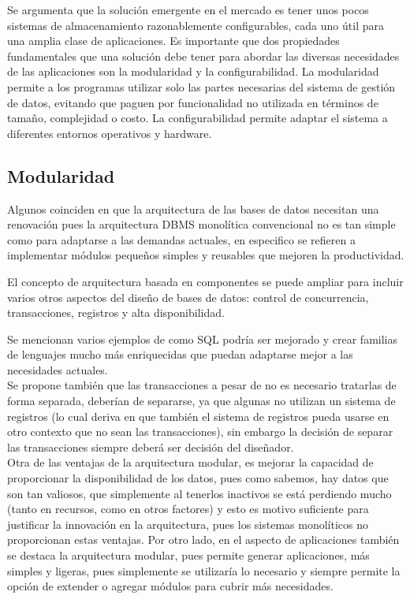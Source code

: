 \documentclass[12pt]{article}
\begin{document}
        Se argumenta que la solución emergente en el mercado es tener unos pocos sistemas de almacenamiento razonablemente configurables, cada uno útil para una amplia clase de aplicaciones. Es importante que dos propiedades fundamentales que una solución debe tener para abordar las diversas necesidades de las aplicaciones son la modularidad y la configurabilidad. La modularidad permite a los programas utilizar solo las partes necesarias del sistema de gestión de datos, evitando que paguen por funcionalidad no utilizada en términos de tamaño, complejidad o costo. La configurabilidad permite adaptar el sistema a diferentes entornos operativos y hardware.

    \subsection{Modularidad}

    Algunos coinciden en que la arquitectura de las bases de datos necesitan una renovación pues la arquitectura DBMS monolítica convencional no es tan simple como para adaptarse a las demandas actuales, en especifico se refieren a implementar módulos pequeños simples y reusables que mejoren la productividad.

    El concepto de arquitectura basada en componentes se puede ampliar para incluir varios otros aspectos del diseño de bases de datos: control de concurrencia, transacciones, registros y alta disponibilidad.

    Se mencionan varios ejemplos de como SQL podría ser mejorado y crear familias de lenguajes mucho más enriquecidas que puedan adaptarse mejor a las necesidades actuales. \\

    Se propone también que las transacciones a pesar de no es necesario tratarlas de forma separada, deberían de separarse, ya que algunas no utilizan un sistema de registros (lo cual deriva en que también el sistema de registros pueda usarse en otro contexto que no sean las transacciones), sin embargo la decisión de separar las transacciones siempre deberá ser decisión del diseñador. \\

    Otra de las ventajas de la arquitectura modular, es mejorar la capacidad de proporcionar la disponibilidad de los datos, pues como sabemos, hay datos que son tan valiosos, que simplemente al tenerlos inactivos se está perdiendo mucho (tanto en recursos, como en otros factores) y esto es motivo suficiente para justificar la innovación en la arquitectura, pues los sistemas monolíticos no proporcionan estas ventajas. Por otro lado, en el aspecto de aplicaciones también se destaca la arquitectura modular, pues permite generar aplicaciones, más simples y ligeras, pues simplemente se utilizaría lo necesario y siempre permite la opción de extender o agregar módulos para cubrir más necesidades.
\end{document}
